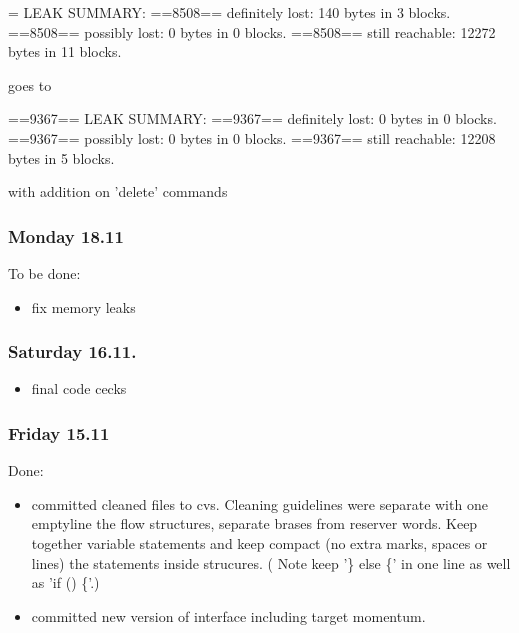 \begin{itemize}
\begin{verbatim*}

= LEAK SUMMARY:
==8508==    definitely lost: 140 bytes in 3 blocks.
==8508==    possibly lost:   0 bytes in 0 blocks.
==8508==    still reachable: 12272 bytes in 11 blocks.

goes to

==9367== LEAK SUMMARY:
==9367==    definitely lost: 0 bytes in 0 blocks.
==9367==    possibly lost:   0 bytes in 0 blocks.
==9367==    still reachable: 12208 bytes in 5 blocks.

\end{verbatim*}
  
  with addition on 'delete' commands

\end{itemize}
\subsubsection{Monday 18.11}

To be done:
\begin{itemize}
\item fix memory leaks
\end{itemize}

\subsubsection{Saturday 16.11.}

\begin{itemize}
\item final code cecks
\end{itemize}

\subsubsection{Friday 15.11}

Done:

\begin{itemize}

\item committed cleaned files to cvs. Cleaning guidelines were separate with one emptyline the flow structures, separate brases from reserver words. Keep together variable statements and keep compact (no extra marks, spaces or lines) the statements inside strucures. ( Note keep '\} else \{' in one line as well as 'if () \{'.)
\item committed new version of interface including target momentum.

\end{itemize}

